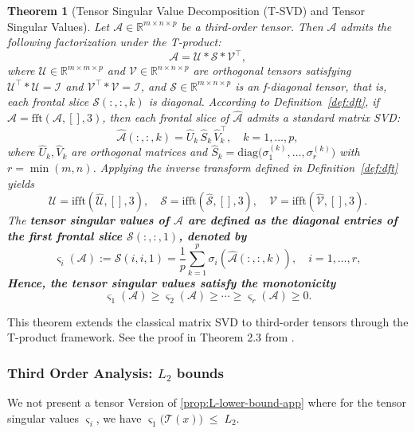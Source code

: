 \documentclass{article}
\theoremstyle{plain}
\newtheorem{theorem}{Theorem}
\theoremstyle{definition}
\theoremstyle{remark}
\begin{document}
\begin{theorem}[Tensor Singular Value Decomposition (T-SVD) and Tensor Singular Values]
\label{thm:tsvd}
Let $\mathcal{A}\in\mathbb{R}^{m\times n\times p}$ be a third-order tensor. 
Then $\mathcal{A}$ admits the following factorization under the T-product:
\[
\mathcal{A} = \mathcal{U} * \mathcal{S} * \mathcal{V}^\top,
\]
where $\mathcal{U}\in\mathbb{R}^{m\times m\times p}$ and 
$\mathcal{V}\in\mathbb{R}^{n\times n\times p}$ are orthogonal tensors satisfying 
$\mathcal{U}^\top * \mathcal{U} = \mathcal{I}$ and $\mathcal{V}^\top * \mathcal{V} = \mathcal{I}$, 
and $\mathcal{S}\in\mathbb{R}^{m\times n\times p}$ is an \emph{f-diagonal tensor}, 
that is, each frontal slice $\mathcal{S}(:,:,k)$ is diagonal.
According to Definition~\ref{def:dft}, if 
$\widehat{\mathcal{A}}=\mathrm{fft}(\mathcal{A},[],3)$, 
then each frontal slice of $\widehat{\mathcal{A}}$ admits a standard matrix SVD:
\[
\widehat{\mathcal{A}}(:,:,k)
= \widehat{U}_k\,\widehat{S}_k\,\widehat{V}_k^\top, 
\quad k=1,\dots,p,
\]
where $\widehat{U}_k,\widehat{V}_k$ are orthogonal matrices and 
$\widehat{S}_k=\mathrm{diag}\big(\sigma_1^{(k)},\dots,\sigma_{r}^{(k)}\big)$ with $r=\min(m,n)$. Applying the inverse transform defined in Definition~\ref{def:dft} yields
\[
\mathcal{U}=\mathrm{ifft}(\widehat{\mathcal{U}},[],3), \quad
\mathcal{S}=\mathrm{ifft}(\widehat{\mathcal{S}},[],3), \quad
\mathcal{V}=\mathrm{ifft}(\widehat{\mathcal{V}},[],3).
\]
The \bf{tensor singular values} of $\mathcal{A}$ are defined as the diagonal entries of the first frontal slice $\mathcal{S}(:,:,1)$, denoted by
\[
\varsigma_i(\mathcal{A}) := \mathcal{S}(i,i,1)
= \frac{1}{p}\sum_{k=1}^{p}\sigma_i(\widehat{\mathcal{A}}(:,:,k)), 
\quad i=1,\dots,r,
\]
Hence, the tensor singular values satisfy the monotonicity
\[
\varsigma_1(\mathcal{A}) \ge \varsigma_2(\mathcal{A}) \ge \cdots 
\ge \varsigma_r(\mathcal{A}) \ge 0.
\]
\end{theorem}
This theorem extends the classical matrix SVD to third-order tensors through the T-product framework. See the proof in Theorem 2.3 from \citet{zhang2021note}.


\subsubsection{Third Order Analysis: $L_2$ bounds}

We not present a tensor Version of \cref{prop:L-lower-bound-app} where for the tensor singular values $\varsigma_i$, we have $\varsigma_1\!\big(\mathcal{T}(x)\big) \;\le\; L_2$.
\end{document}
